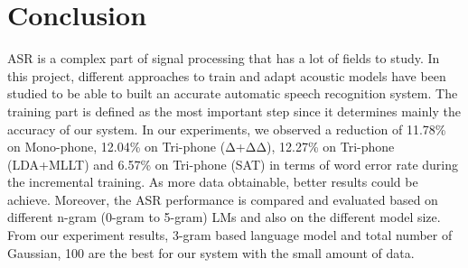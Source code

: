 \documentclass[conference]{IEEEtran}
\begin{document}
\section{Conclusion}
\label{sec:conclusion}

ASR is a complex part of signal processing that has a lot of fields to study. In this project, different approaches to train and adapt acoustic models have been studied to be able to built an accurate automatic speech recognition system. The training part is defined as the most important step since it determines mainly the accuracy of our system. In our experiments, we observed a reduction of 11.78\% on Mono-phone, 12.04\% on Tri-phone (Δ+ΔΔ), 12.27\% on Tri-phone (LDA+MLLT) and 6.57\% on Tri-phone (SAT) in terms of word error rate during the incremental training. As more data obtainable, better results could be achieve. Moreover, the ASR performance is compared and evaluated based on different n-gram (0-gram to 5-gram) LMs and also on the different model size.  From our experiment results, 3-gram based language model and total number of Gaussian, 100 are the best for our system with the small amount of data. 






\end{document}
